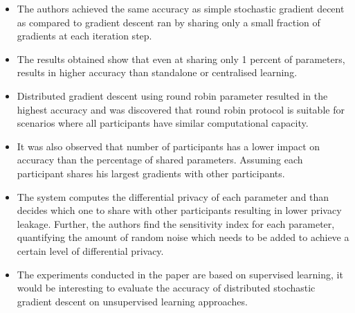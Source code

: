 \begin{itemize}
	\item The authors achieved the same accuracy as simple stochastic gradient decent as compared to gradient 
	descent ran by sharing only a small fraction of gradients at each iteration step. 	
	
	\item The results obtained show that even at sharing only 1 percent of parameters, results in higher accuracy
	than standalone or centralised learning. 
	
	\item Distributed gradient descent using round robin parameter resulted in the highest accuracy and was discovered 
	that round robin protocol is suitable for scenarios where all participants have similar computational capacity. 
	
	\item It was also observed that number of participants has a lower impact on accuracy than the percentage of shared
	parameters. Assuming each participant shares his largest gradients with other participants.
	
	\item The system computes the differential privacy of each parameter and than decides which one to share with other 
	participants resulting in lower privacy leakage. Further, the authors find the sensitivity index for each parameter, 	
	quantifying the amount of random noise which needs to be added to achieve a certain level of differential privacy.
	
	\item The experiments conducted in the paper are based on supervised learning, it would be interesting to evaluate 
	the accuracy of distributed stochastic gradient descent on unsupervised learning approaches. 
	
\end{itemize}
